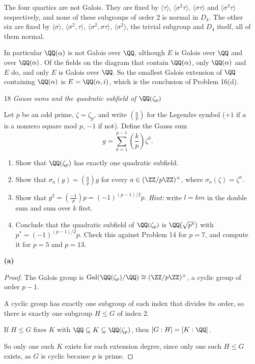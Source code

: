 \documentclass[11pt]{article}
\begin{document}
The four quartics are not Galois. They are fixed by $\langle\tau\rangle$, $\langle\sigma^{2}\tau\rangle$, $\langle\sigma\tau\rangle$ and $\langle\sigma^{3}\tau\rangle$ respectively, and none of these subgroups of order $2$ is normal in $D_{4}$. The other six are fixed by $\langle\sigma\rangle$, $\langle\sigma^{2},\tau\rangle$, $\langle\sigma^{2},\sigma\tau\rangle$, $\langle\sigma^{2}\rangle$, the trivial subgroup and $D_{4}$ itself, all of them normal.

In particular $\QQ(\alpha)$ is not Galois over $\QQ$, although $E$ is Galois over $\QQ$ and over $\QQ(\alpha)$. Of the fields on the diagram that contain $\QQ(\alpha)$, only $\QQ(\alpha)$ and $E$ do, and only $E$ is Galois over $\QQ$. So the smallest Galois extension of $\QQ$ containing $\QQ(\alpha)$ is $E=\QQ(\alpha,i)$, which is the conclusion of Problem 16(d).

\begin{problem}{18}
  \textit{Gauss sums and the quadratic subfield of $\QQ(\zeta_p)$}\par
  Let $p$ be an odd prime, $\zeta=\zeta_p$, and write $\left(\frac ap\right)$ for the Legendre symbol ($+1$ if $a$ is a nonzero square mod $p$, $-1$ if not). Define the Gauss sum \[ g=\sum_{k=1}^{p-1}\left(\frac kp\right)\zeta^k. \]
  \begin{enumerate}[label=(\alph*)]
    \item Show that $\QQ(\zeta_p)$ has exactly one quadratic subfield.
    \item Show that $\sigma_a(g)=\left(\frac ap\right)g$ for every $a\in(\ZZ/p\ZZ)^\times$, where $\sigma_a(\zeta)=\zeta^a$.
    \item Show that $g^2=\left(\frac{-1}{p}\right)p=(-1)^{(p-1)/2}p$. \emph{Hint:} write $l=km$ in the double sum and sum over $k$ first.
    \item Conclude that the quadratic subfield of $\QQ(\zeta_p)$ is $\QQ(\sqrt{p^*})$ with $p^*=(-1)^{(p-1)/2}p$. Check this against Problem 14 for $p=7$, and compute it for $p=5$ and $p=13$.
  \end{enumerate}
\end{problem}
\noindent\textbf{(a)}
\begin{proof}
The Galois group is $\operatorname{Gal}(\QQ(\zeta_p)/\QQ)\cong(\ZZ/p\ZZ)^\times$, a cyclic group of order $p-1$.

A cyclic group has exactly one subgroup of each index that divides its order, so there is exactly one subgroup $H\le G$ of index $2$.

If $H\le G$ fixes $K$ with $\QQ\subseteq K\subseteq\QQ(\zeta_p)$, then $[G:H]=[K:\QQ]$.

So only one such $K$ exists for each extension degree, since only one such $H\le G$ exists, as $G$ is cyclic because $p$ is prime.
\end{proof}
\end{document}
